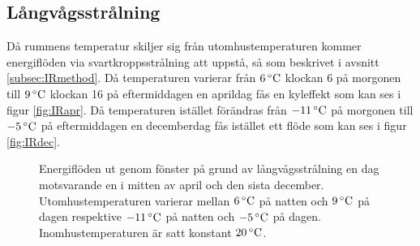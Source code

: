 \subsection{Långvågsstrålning}

Då rummens temperatur skiljer sig från utomhustemperaturen kommer energiflöden via svartkroppsstrålning att uppstå, så som beskrivet i avsnitt \ref{subsec:IRmethod}. Då temperaturen varierar från $\unit[6]{^{\circ}C}$ klockan 6 på morgonen till $\unit[9]{^{\circ}C}$ klockan 16 på eftermiddagen en aprildag fås en kyleffekt som kan ses i figur \ref{fig:IRapr}. Då temperaturen istället förändras från $\unit[-11]{^{\circ}C}$ på morgonen till $\unit[-5]{^{\circ}C}$ på eftermiddagen en decemberdag fås istället ett flöde som kan ses i figur \ref{fig:IRdec}.

\begin{figure}[hpbt]
\centering

\vspace{1cm}

\caption{\label{fig:IRwindows} Energiflöden ut genom fönster på grund av långvågsstrålning en dag motsvarande en i mitten av april och den sista december.
Utomhustemperaturen varierar mellan $\unit[6]{^\circ C}$ på natten och $\unit[9]{^\circ C}$ på dagen respektive $\unit[-11]{^\circ C}$ på natten och $\unit[-5]{^\circ C}$ på dagen. Inomhustemperaturen är satt konstant $\unit[20]{^\circ C}$.}
\end{figure}


